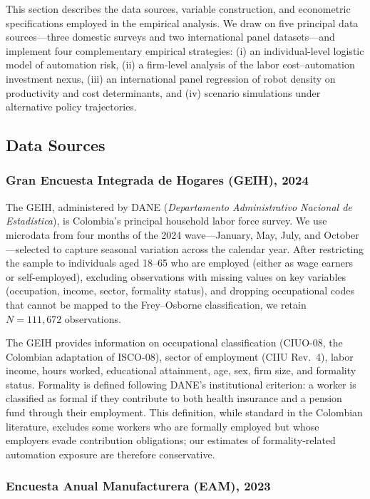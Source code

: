 \documentclass{article}
\begin{document}
This section describes the data sources, variable construction, and econometric specifications employed in the empirical analysis. We draw on five principal data sources---three domestic surveys and two international panel datasets---and implement four complementary empirical strategies: (i) an individual-level logistic model of automation risk, (ii) a firm-level analysis of the labor cost--automation investment nexus, (iii) an international panel regression of robot density on productivity and cost determinants, and (iv) scenario simulations under alternative policy trajectories.


\subsection{Data Sources}
\label{subsec:data_sources}

\subsubsection*{Gran Encuesta Integrada de Hogares (GEIH), 2024}

The GEIH, administered by DANE (\textit{Departamento Administrativo Nacional de Estad\'istica}), is Colombia's principal household labor force survey. We use microdata from four months of the 2024 wave---January, May, July, and October---selected to capture seasonal variation across the calendar year. After restricting the sample to individuals aged 18--65 who are employed (either as wage earners or self-employed), excluding observations with missing values on key variables (occupation, income, sector, formality status), and dropping occupational codes that cannot be mapped to the Frey--Osborne classification, we retain $N = 111{,}672$ observations.

The GEIH provides information on occupational classification (CIUO-08, the Colombian adaptation of ISCO-08), sector of employment (CIIU Rev.\ 4), labor income, hours worked, educational attainment, age, sex, firm size, and formality status. Formality is defined following DANE's institutional criterion: a worker is classified as formal if they contribute to both health insurance and a pension fund through their employment. This definition, while standard in the Colombian literature, excludes some workers who are formally employed but whose employers evade contribution obligations; our estimates of formality-related automation exposure are therefore conservative.

\subsubsection*{Encuesta Anual Manufacturera (EAM), 2023}
\end{document}
